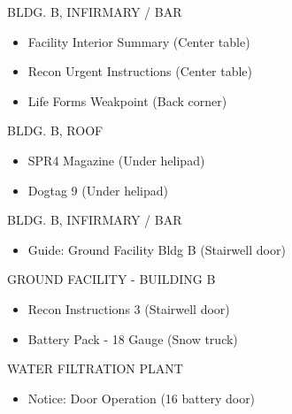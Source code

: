 \begin{subregion}{{BLDG. B, INFIRMARY / BAR}}
    \begin{itemize}
        \item Facility Interior Summary (Center table)
        \item Recon Urgent Instructions (Center table)
        \item Life Forms Weakpoint (Back corner)
    \end{itemize}
\end{subregion}


\begin{subregion}{{BLDG. B, ROOF}}
    \begin{itemize}
        \item SPR4 Magazine (Under helipad)
        \item Dogtag 9 (Under helipad)
    \end{itemize}
\end{subregion}

\begin{subregion}{{BLDG. B, INFIRMARY / BAR}}
    \begin{itemize}
        \item Guide: Ground Facility Bldg B (Stairwell door)
    \end{itemize}
\end{subregion}

\begin{subregion}{GROUND FACILITY - BUILDING B}
    \begin{itemize}
        \item Recon Instructions 3 (Stairwell door)
        \item Battery Pack - 18 Gauge (Snow truck)
    \end{itemize}
\end{subregion}

\begin{subregion}{WATER FILTRATION PLANT}
    \begin{itemize}
        \item Notice: Door Operation (16 battery door)
    \end{itemize}
\end{subregion}
